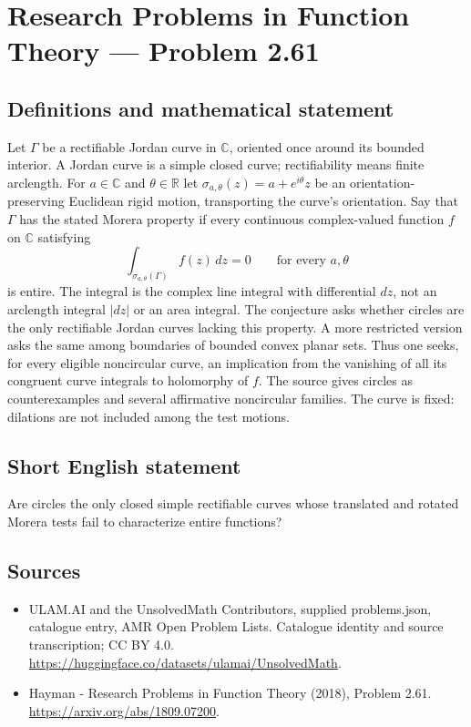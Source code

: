 \documentclass[11pt,a4paper]{article}
\begin{document}
\section*{Research Problems in Function Theory — Problem 2.61}\label{statement}

\subsection{Definitions and mathematical statement}
Let $\Gamma$ be a rectifiable Jordan curve in $\mathbb C$, oriented once around its bounded interior. A Jordan curve is a simple closed curve; rectifiability means finite arclength. For $a\in\mathbb C$ and $\theta\in\mathbb R$ let
$\sigma_{a,\theta}(z)=a+e^{i\theta}z$ be an orientation-preserving Euclidean rigid motion, transporting the curve's orientation.
Say that $\Gamma$ has the stated Morera property if every continuous complex-valued function $f$ on $\mathbb C$ satisfying
\[
\int_{\sigma_{a,\theta}(\Gamma)} f(z)\,dz=0
\qquad\text{for every }a,\theta
\]
is entire. The integral is the complex line integral with differential $dz$, not an arclength integral $|dz|$ or an area integral.
The conjecture asks whether circles are the only rectifiable Jordan curves lacking this property. A more restricted version asks the same among boundaries of bounded convex planar sets. Thus one seeks, for every eligible noncircular curve, an implication from the vanishing of all its congruent curve integrals to holomorphy of $f$. The source gives circles as counterexamples and several affirmative noncircular families. The curve is fixed: dilations are not included among the test motions.
\subsection{Short English statement}
Are circles the only closed simple rectifiable curves whose translated and rotated Morera tests fail to characterize entire functions?
\subsection{Sources}
\begin{itemize}
\item[S1] ULAM.AI and the UnsolvedMath Contributors, supplied problems.json, catalogue entry, AMR Open Problem Lists. Catalogue identity and source transcription; CC BY 4.0.
\url{https://huggingface.co/datasets/ulamai/UnsolvedMath}.
\item[S2] Hayman - Research Problems in Function Theory (2018), Problem 2.61. 
\url{https://arxiv.org/abs/1809.07200}.
\end{itemize}
\end{document}
